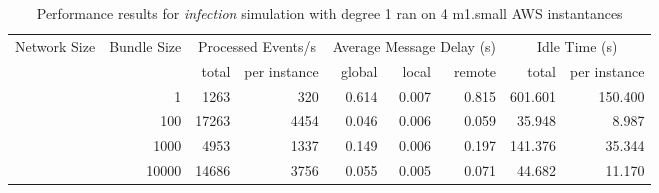 \begin{table}
	  \caption[Performance results, \emph{infection:1 on 4 m1.small instances }]{ Performance results for \emph{ infection } simulation with degree 1 ran on 4 m1.small AWS instantances }
	\begin{tabular}{rrrrrrrrr}
	\hline\noalign{\smallskip}

	Network Size &
	Bundle Size &
	\multicolumn{2}{c}{Processed Events/s} & 
	\multicolumn{3}{c}{Average Message Delay (s)} & 
	\multicolumn{2}{c}{Idle Time (s)}  \\

	 & 
	 & 
	 total & per instance
     & global & local & remote
     & total & per instance\\

			
				\noalign{\smallskip}\hline
				\multirow{ 4 }{*}{ 40000 } &
				
					
					 
					\multirow{ 1 }{*}{ 1 } &
					
						
							    
							     1263  & 320  
	                           & 0.614 & 0.007 & 0.815
	                           & 601.601 & 150.400  \\
	                
	            
					 &  
					 
					\multirow{ 1 }{*}{ 100 } &
					
						
							    
							     17263  & 4454  
	                           & 0.046 & 0.006 & 0.059
	                           & 35.948 & 8.987  \\
	                
	            
					 &  
					 
					\multirow{ 1 }{*}{ 1000 } &
					
						
							    
							     4953  & 1337  
	                           & 0.149 & 0.006 & 0.197
	                           & 141.376 & 35.344  \\
	                
	            
					 &  
					 
					\multirow{ 1 }{*}{ 10000 } &
					
						
							    
							     14686  & 3756  
	                           & 0.055 & 0.005 & 0.071
	                           & 44.682 & 11.170  \\
	                

\end{tabular}
\end{table}
